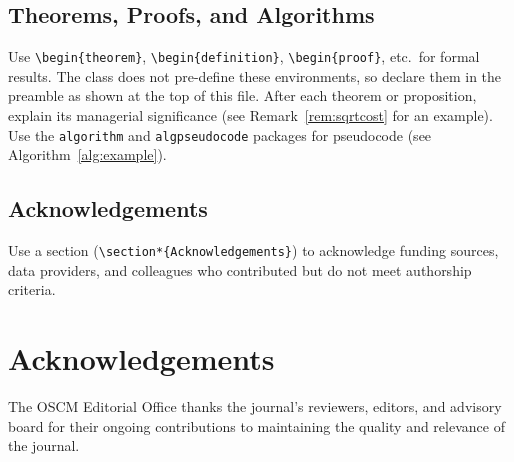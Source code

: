 \documentclass[preprint]{oscmjournal}
\newtheorem{theorem}{Theorem}
\newtheorem{definition}{Definition}
\begin{document}
\subsection{Theorems, Proofs, and Algorithms}

Use \verb|\begin{theorem}|, \verb|\begin{definition}|, \verb|\begin{proof}|, etc.\ for formal results.
The class does not pre-define these environments, so declare them in the preamble as shown at the top of this file.
After each theorem or proposition, explain its managerial significance (see Remark~\ref{rem:sqrtcost} for an example).
Use the \texttt{algorithm} and \texttt{algpseudocode} packages for pseudocode (see Algorithm~\ref{alg:example}).

\subsection{Acknowledgements}

Use a section (\verb|\section*{Acknowledgements}|) to acknowledge funding sources, data providers, and colleagues who contributed but do not meet authorship criteria.


\section*{Acknowledgements}

The OSCM Editorial Office thanks the journal's reviewers, editors, and advisory board for their ongoing contributions to maintaining the quality and relevance of the journal.


\printbibliography[title={REFERENCES}]


\end{document}
